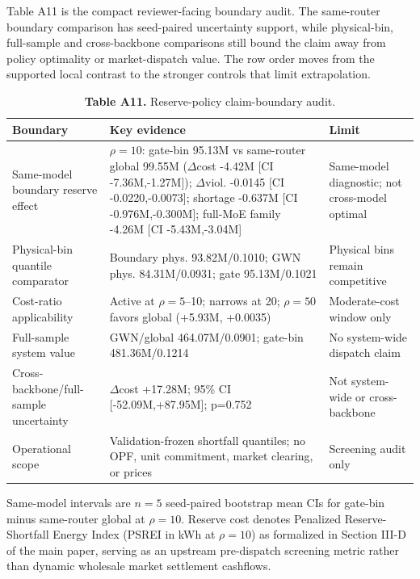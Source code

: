 \documentclass[
  journal]{IEEEtran}
\begin{document}
Table A11 is the compact reviewer-facing boundary audit. The same-router
boundary comparison has seed-paired uncertainty support, while
physical-bin, full-sample and cross-backbone comparisons still bound the
claim away from policy optimality or market-dispatch value. The row
order moves from the supported local contrast to the stronger controls
that limit extrapolation.

\begin{table}[!t]
\centering
\fontsize{8.0pt}{9.6pt}\selectfont
\setlength{\tabcolsep}{2.4pt}
\renewcommand{\arraystretch}{1.03}
\caption*{\textbf{Table A11.} Reserve-policy claim-boundary audit.}
\begin{tabularx}{\linewidth}{>{\raggedright\arraybackslash}p{} >{\raggedright\arraybackslash}X >{\raggedright\arraybackslash}p{}}
\toprule
Boundary & Key evidence & Limit \\
\midrule
Same-model boundary reserve effect & $\rho=10$: gate-bin 95.13M vs same-router global 99.55M ($\Delta$cost -4.42M [CI -7.36M,-1.27M]); $\Delta$viol. -0.0145 [CI -0.0220,-0.0073]; shortage -0.637M [CI -0.976M,-0.300M]; full-MoE family -4.26M [CI -5.43M,-3.04M] & Same-model diagnostic; not cross-model optimal \\
Physical-bin quantile comparator & Boundary phys. 93.82M/0.1010; GWN phys. 84.31M/0.0931; gate 95.13M/0.1021 & Physical bins remain competitive \\
Cost-ratio applicability & Active at $\rho=5$--10; narrows at 20; $\rho=50$ favors global (+5.93M, +0.0035) & Moderate-cost window only \\
Full-sample system value & GWN/global 464.07M/0.0901; gate-bin 481.36M/0.1214 & No system-wide dispatch claim \\
Cross-backbone/full-sample uncertainty & $\Delta$cost +17.28M; 95\% CI [-52.09M,+87.95M]; p=0.752 & Not system-wide or cross-backbone \\
Operational scope & Validation-frozen shortfall quantiles; no OPF, unit commitment, market clearing, or prices & Screening audit only \\
\bottomrule
\end{tabularx}
\vspace{1mm}
\fontsize{8.0pt}{9.6pt}\selectfont Same-model intervals are $n=5$ seed-paired bootstrap mean CIs for gate-bin minus same-router global at $\rho=10$. Reserve cost denotes Penalized Reserve-Shortfall Energy Index (PSREI in kWh at $\rho=10$) as formalized in Section III-D of the main paper, serving as an upstream pre-dispatch screening metric rather than dynamic wholesale market settlement cashflows.
\end{table}
\end{document}
